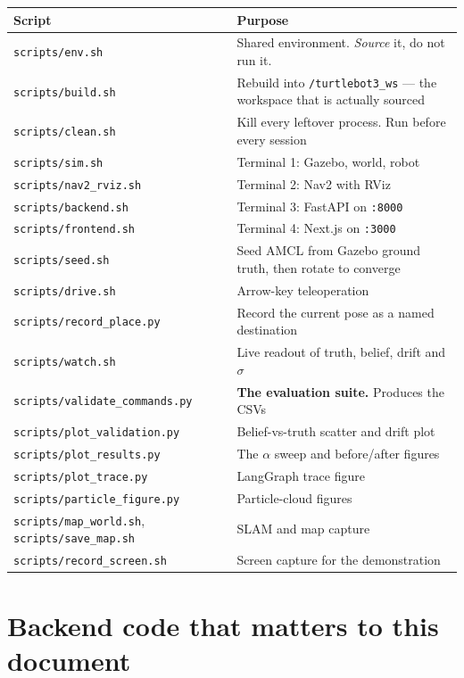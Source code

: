 \documentclass[11pt,a4paper]{report}
\newcommand{\file}[1]{\texttt{\small #1}}
\begin{document}
\begin{center}
\small
\begin{tabular}{@{}p{}p{}@{}}
\toprule
\textbf{Script} & \textbf{Purpose} \\
\midrule
\file{scripts/env.sh} & Shared environment. \emph{Source} it, do not run it. \\
\file{scripts/build.sh} & Rebuild into \file{\raisebox{0pt}{\textasciitilde}/turtlebot3\_ws} --- the workspace that is
   actually sourced \\
\file{scripts/clean.sh} & Kill every leftover process. Run before every session \\
\midrule
\file{scripts/sim.sh} & Terminal 1: Gazebo, world, robot \\
\file{scripts/nav2\_rviz.sh} & Terminal 2: Nav2 with RViz \\
\file{scripts/backend.sh} & Terminal 3: FastAPI on \file{:8000} \\
\file{scripts/frontend.sh} & Terminal 4: Next.js on \file{:3000} \\
\midrule
\file{scripts/seed.sh} & Seed AMCL from Gazebo ground truth, then rotate to converge \\
\file{scripts/drive.sh} & Arrow-key teleoperation \\
\file{scripts/record\_place.py} & Record the current pose as a named destination \\
\file{scripts/watch.sh} & Live readout of truth, belief, drift and $\sigma$ \\
\midrule
\file{scripts/validate\_commands.py} & \textbf{The evaluation suite.} Produces the CSVs \\
\file{scripts/plot\_validation.py} & Belief-vs-truth scatter and drift plot \\
\file{scripts/plot\_results.py} & The $\alpha$ sweep and before/after figures \\
\file{scripts/plot\_trace.py} & LangGraph trace figure \\
\file{scripts/particle\_figure.py} & Particle-cloud figures \\
\midrule
\file{scripts/map\_world.sh}, \file{scripts/save\_map.sh} & SLAM and map capture \\
\file{scripts/record\_screen.sh} & Screen capture for the demonstration \\
\bottomrule
\end{tabular}
\end{center}

\section{Backend code that matters to this document}
\end{document}
